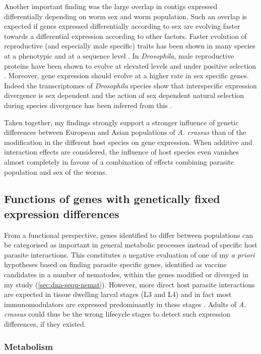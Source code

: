 \documentclass[10pt]{article}
\begin{document}
Another important finding was the large overlap in contigs expressed
differentially depending on worm sex and worm population. Such an
overlap is expected if genes expressed differentially according to sex
are evolving faster towards a differential expression according to
other factors. Faster evolution of reproductive (and especially male
specific) traits has been shown in many species at a phenotypic and at
a sequence level \cite{pmid15795858}. In \textit{Drosophila}, male
reproductive proteins have been shown to evolve at elevated levels and
under positive selection \cite{pmid11404480}. Moreover, gene
expression should evolve at a higher rate in sex specific genes.
Indeed the transcriptomes of \textit{Drosophila} species show that
interspecific expression divergence is sex dependent and the action of
sex dependent natural selection during species divergence has been
inferred from this \cite{pmid15034135,pmid19720861}.

Taken together, my findings strongly support a stronger influence of
genetic differences between European and Asian populations of
\textit{A. crassus} than of the modification in the different host
species on gene expression. When additive and interaction effects are
considered, the influence of host species even vanishes almost
completely in favour of a combination of effects combining parasite
population and sex of the worms.

\subsection{Functions of genes with genetically fixed expression
  differences}
\label{sec:function-genes-with}

From a functional perspective, genes identified to differ between
populations can be categorised as important in general metabolic
processes instead of specific host parasite interactions. This
constitutes a negative evaluation of one of my \textit{a priori}
hypotheses based on finding parasite specific genes, identified as
vaccine candidates in a number of nematodes, within the genes modified
or diverged in my study (\ref{sec:dna-sequ-nemat}). However, more
direct host parasite interactions are expected in tissue dwelling
larval stages (L3 and L4) and in fact most immunomodulators are
expressed predominantly in these stages
\cite{maizels_helminth_2004}. Adults of \textit{A. crassus} could thus
be the wrong lifecycle stages to detect such expression differences,
if they existed.

\subsubsection{Metabolism}
\label{sec:metabolism}
\end{document}

